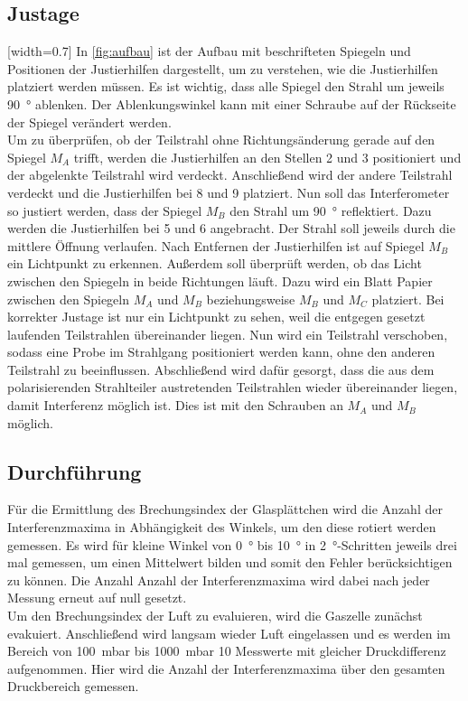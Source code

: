 \subsection{Justage}
[width=0.7\textwidth]
In \autoref{fig:aufbau} ist der Aufbau mit beschrifteten Spiegeln und Positionen der Justierhilfen dargestellt, um zu verstehen, wie die Justierhilfen platziert werden müssen. Es ist wichtig, dass alle Spiegel den Strahl um jeweils \SI{90}{\degree} ablenken. Der Ablenkungswinkel kann mit einer Schraube auf der Rückseite der Spiegel verändert werden.\\
Um zu überprüfen, ob der Teilstrahl ohne Richtungsänderung gerade auf den Spiegel $M_A$ trifft, werden die Justierhilfen an den Stellen 2 und 3 positioniert und der abgelenkte Teilstrahl wird verdeckt. Anschließend wird der andere Teilstrahl verdeckt und die Justierhilfen bei 8 und 9 platziert. Nun soll das Interferometer so justiert werden, dass der Spiegel $M_B$ den Strahl um \SI{90}{\degree} reflektiert. Dazu werden die Justierhilfen bei 5 und 6 angebracht. Der Strahl soll jeweils durch die mittlere Öffnung verlaufen. Nach Entfernen der Justierhilfen ist auf Spiegel $M_B$ ein Lichtpunkt zu erkennen. Außerdem soll überprüft werden, ob das Licht zwischen den Spiegeln in beide Richtungen läuft. Dazu wird ein Blatt Papier zwischen den Spiegeln $M_A$ und $M_B$ beziehungsweise $M_B$ und $M_C$ platziert. Bei korrekter Justage ist nur ein Lichtpunkt zu sehen, weil die entgegen gesetzt laufenden Teilstrahlen übereinander liegen. Nun wird ein Teilstrahl verschoben, sodass eine Probe im Strahlgang positioniert werden kann, ohne den anderen Teilstrahl zu beeinflussen. Abschließend wird dafür gesorgt, dass die aus dem polarisierenden Strahlteiler austretenden Teilstrahlen wieder übereinander liegen, damit Interferenz möglich ist. Dies ist mit den Schrauben an $M_A$ und $M_B$ möglich.

\subsection{Durchführung}
Für die Ermittlung des Brechungsindex der Glasplättchen wird die Anzahl der Interferenzmaxima in Abhängigkeit des Winkels, um den diese rotiert werden gemessen. Es wird für kleine Winkel von \SI{0}{\degree} bis \SI{10}{\degree} in \SI{2}{\degree}-Schritten jeweils drei mal gemessen, um einen Mittelwert bilden und somit den Fehler berücksichtigen zu können. Die Anzahl Anzahl der Interferenzmaxima wird dabei nach jeder Messung erneut auf null gesetzt.\\
Um den Brechungsindex der Luft zu evaluieren, wird die Gaszelle zunächst evakuiert. Anschließend wird langsam wieder Luft eingelassen und es werden im Bereich von \SI{100}{\milli\bar} bis \SI{1000}{\milli\bar} 10 Messwerte mit gleicher Druckdifferenz aufgenommen. Hier wird die Anzahl der Interferenzmaxima über den gesamten Druckbereich gemessen.
